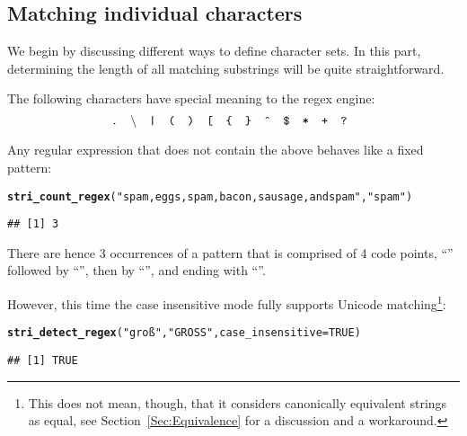 \documentclass[nojss]{jss}\usepackage[]{graphicx}\usepackage[]{xcolor}
\makeatletter
\newcommand{\hlnum}[1]{\textcolor[rgb]{0.686,0.059,0.569}{#1}}%
\newcommand{\hlstr}[1]{\textcolor[rgb]{0.192,0.494,0.8}{#1}}%
\newcommand{\hlstd}[1]{\textcolor[rgb]{0.345,0.345,0.345}{#1}}%
\newcommand{\hlkwc}[1]{\textcolor[rgb]{0.333,0.667,0.333}{#1}}%
\newcommand{\hlkwd}[1]{\textcolor[rgb]{0.737,0.353,0.396}{\textbf{#1}}}%
\newenvironment{kframe}{%
 \def\at@end@of@kframe{}%
 \ifinner\ifhmode%
  \def\at@end@of@kframe{\end{minipage}}%
  \begin{minipage}{\columnwidth}%
 \fi\fi%
 \def\FrameCommand##1{\hskip\@totalleftmargin \hskip-\fboxsep
 \colorbox{shadecolor}{##1}\hskip-\fboxsep
     \hskip-\linewidth \hskip-\@totalleftmargin \hskip\columnwidth}%
 \MakeFramed {\advance\hsize-\width
   \@totalleftmargin\z@ \linewidth\hsize
   \@setminipage}}%
 {\par\unskip\endMakeFramed%
 \at@end@of@kframe}
\newenvironment{knitrout}{}{} %
\makeatother
\begin{document}
\subsection{Matching individual characters}\label{Sec:RegexIndividualChars}

We begin by discussing different ways to define character sets.
In this part, determining the length of all matching substrings
will be quite straightforward.

The following characters have special
meaning to the regex engine:
\[
\text{
  \texttt{.}\quad
  \textbackslash{}\quad
  \texttt{|}\quad
  \texttt{(}\quad
  \texttt{)}\quad
  \texttt{[}\quad
  \texttt{\{}\quad
  \texttt{\}}\quad
  \texttt{\^{}}\quad
  \texttt{\$}\quad
  \texttt{*}\quad
  \texttt{+}\quad
  \texttt{?}\quad
}
\]

Any regular expression that does not contain the above
behaves like a fixed pattern:

\begin{knitrout}
\color{fgcolor}\begin{kframe}
\begin{alltt}
\hlkwd{stri_count_regex}\hlstd{(}\hlstr{"spam, eggs, spam, bacon, sausage, and spam"}\hlstd{,} \hlstr{"spam"}\hlstd{)}
\end{alltt}
\begin{verbatim}
## [1] 3
\end{verbatim}
\end{kframe}
\end{knitrout}

There are hence 3 occurrences of a pattern that is comprised
of 4 code points, ``'' followed by ``'',
then by ``'', and ending with ``''.

However, this time the case insensitive mode fully
supports Unicode matching\footnote{%
This does not mean, though, that it considers canonically
equivalent strings as equal,
see Section~\ref{Sec:Equivalence} for a discussion and a workaround.}:

\begin{knitrout}
\color{fgcolor}\begin{kframe}
\begin{alltt}
\hlkwd{stri_detect_regex}\hlstd{(}\hlstr{"groß"}\hlstd{,} \hlstr{"GROSS"}\hlstd{,} \hlkwc{case_insensitive}\hlstd{=}\hlnum{TRUE}\hlstd{)}
\end{alltt}
\begin{verbatim}
## [1] TRUE
\end{verbatim}
\end{kframe}
\end{knitrout}
\end{document}
